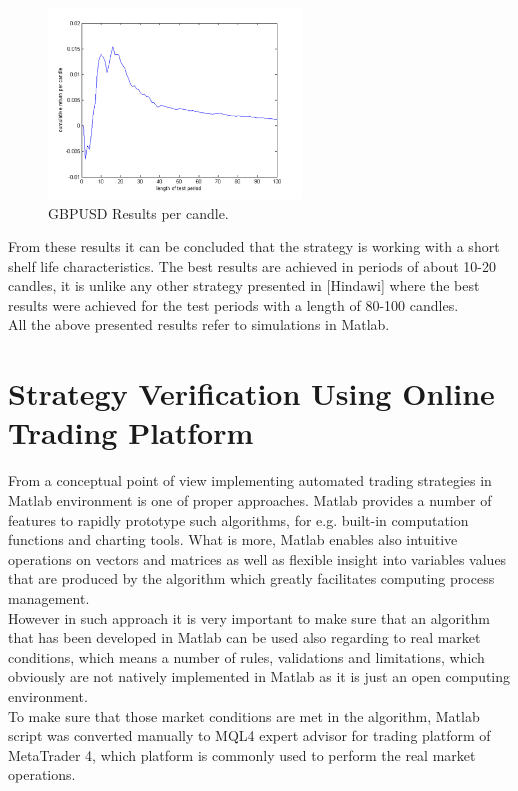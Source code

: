 \documentclass[runningheads,a4paper]{llncs}
\begin{document}
\begin{figure}[h!]
\centering
\includegraphics[width = 0.6\textwidth]{figures/rys11.png}
\caption{GBPUSD Results per candle.}
\label{fig:fig11}
\end{figure}
\FloatBarrier

From these results it can be concluded that the strategy is working with a short shelf life characteristics. The best results are achieved in periods of about 10-20 candles, it is unlike any other strategy presented in [Hindawi] where the best results were achieved for the test periods with a length of 80-100 candles.\\
All the above presented results refer to simulations in Matlab.

\section{Strategy Verification Using Online Trading Platform}
From a conceptual point of view implementing automated trading strategies in Matlab environment is one of proper approaches. Matlab provides a number of features to rapidly prototype such algorithms, for e.g. built-in computation functions and charting tools. What is more, Matlab enables also intuitive operations on vectors and matrices as well as flexible insight into variables values that are produced by the algorithm which greatly facilitates computing process management.\\

However in such approach it is very important to make sure that an algorithm that has been developed in Matlab can be used also regarding to real market conditions, which means a number of rules, validations and limitations, which obviously are not natively implemented in Matlab as it is just an open computing environment.\\

To make sure that those market conditions are met in the algorithm, Matlab script was converted manually to MQL4 expert advisor for trading platform of MetaTrader 4, which platform is commonly used to perform the real market operations.\\
\end{document}
